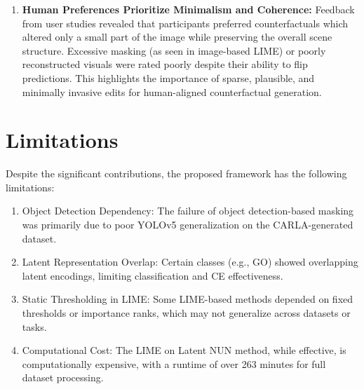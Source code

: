 \begin{enumerate}
    \item \textbf{Human Preferences Prioritize Minimalism and Coherence:} 
    Feedback from user studies revealed that participants preferred counterfactuals which altered only a small part of the image while preserving the overall scene structure. Excessive masking (as seen in image-based LIME) or poorly reconstructed visuals were rated poorly despite their ability to flip predictions. This highlights the importance of sparse, plausible, and minimally invasive edits for human-aligned counterfactual generation.
\end{enumerate}


\section{Limitations}
Despite the significant contributions, the proposed framework has the following limitations:
\begin{enumerate}
    \item Object Detection Dependency: The failure of object detection-based masking was primarily due to poor YOLOv5 generalization on the CARLA-generated dataset.
    \item Latent Representation Overlap: Certain classes (e.g., GO) showed overlapping latent encodings, limiting classification and CE effectiveness.
    \item Static Thresholding in LIME: Some LIME-based methods depended on fixed thresholds or importance ranks, which may not generalize across datasets or tasks.
    \item Computational Cost: The LIME on Latent NUN method, while effective, is computationally expensive, with a runtime of over 263 minutes for full dataset processing.
\end{enumerate}


